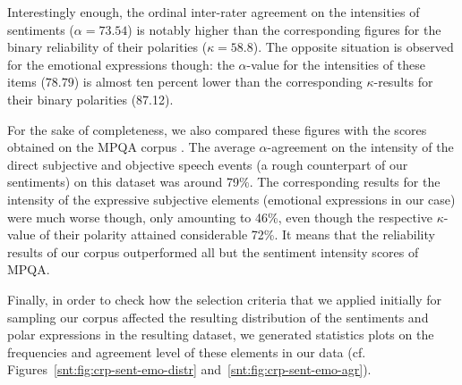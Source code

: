 Interestingly enough, the ordinal inter-rater agreement on the
intensities of sentiments ($\alpha = 73.54$) is notably higher than
the corresponding figures for the binary reliability of their
polarities ($\kappa = 58.8$).  The opposite situation is observed for
the emotional expressions though: the $\alpha$-value for the
intensities of these items ($78.79$) is almost ten percent lower than
the corresponding $\kappa$-results for their binary polarities
(87.12).

For the sake of completeness, we also compared these figures with the
scores obtained on the MPQA corpus \cite[cf.][pp. 38, 80]{Wilson:07}.
The average $\alpha$-agreement on the intensity of the direct
subjective and objective speech events (a rough counterpart of our
sentiments) on this dataset was around 79\%.  The corresponding
results for the intensity of the expressive subjective elements
(emotional expressions in our case) were much worse though, only
amounting to 46\%, even though the respective $\kappa$-value of their
polarity attained considerable 72\%.  It means that the reliability
results of our corpus outperformed all but the sentiment intensity
scores of MPQA.%

Finally, in order to check how the selection criteria that we applied
initially for sampling our corpus affected the resulting distribution
of the sentiments and polar expressions in the resulting dataset, we
generated statistics plots on the frequencies and agreement level of
these elements in our data
(cf. Figures~\ref{snt:fig:crp-sent-emo-distr}
and~\ref{snt:fig:crp-sent-emo-agr}).

